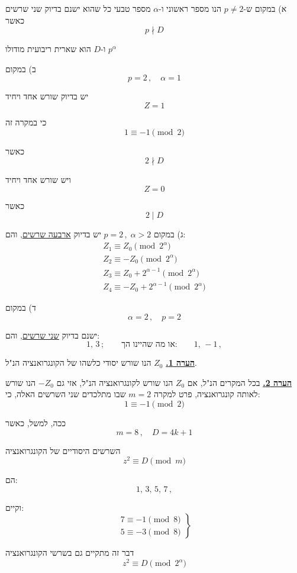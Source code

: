 \noindent א) במקום ש-$p \neq 2$ הנו מספר ראשוני ו-$\alpha$ מספר טבעי כל שהוא ישנם
בדיוק שני שרשים כאשר
\[ p \nmid D \]

\noindent ו-$D$ הוא שארית ריבועית מודולו $p^{\alpha}$

\medskip
\noindent ב) במקום
\[ p = 2 \, , \quad \alpha = 1 \]

\noindent יש בדיוק שורש אחד ויחיד
\[ Z = 1 \]

\noindent כי במקרה זה
\[ 1 \equiv -1 \pmod{2} \]

\noindent כאשר
\[ 2 \nmid D \]

\noindent ויש שורש אחד ויחיד
\[ Z = 0 \]

\noindent כאשר
\[ 2 \mid D \]

\medskip
\noindent ג) במקום $p = 2 \, , \; \alpha > 2$ יש בדיוק \underline{ארבעה שרשים}, והם:
\[ \begin{array}{l}
Z_1 \equiv Z_0 \pmod{2^{\alpha}} \\
Z_2 \equiv -Z_0 \pmod{2^{\alpha}} \\
Z_3 \equiv Z_0 + 2^{\alpha-1} \pmod{2^{\alpha}} \\
Z_4 \equiv -Z_0 + 2^{\alpha-1} \pmod{2^{\alpha}}
\end{array} \]

\medskip
\noindent ד) במקום
\[ \alpha = 2 \, , \quad p = 2 \]

\noindent ישנם בדיוק \underline{שני שרשים}, והם:
\[ 1, \, 3 \, ; \qquad \text{או מה שהיינו הך:} \qquad 1, \, -1 \, , \]

\bigskip
\noindent\textbf{\underline{הערה 1.}} $Z_0$ הנו שורש יסודי כלשהו של הקונגרואנציה הנ"ל.

\noindent\textbf{\underline{הערה 2.}} בכל המקרים הנ"ל, אם $Z_0$ הנו שורש לקונגרואנציה הנ"ל,
אזי גם $-Z_0$ הנו שורש לאותה קונגרואנציה, פרט למקרה $m=2$ שבו
מתלכדים שני השרשים האלה, כי:
\[ 1 \equiv -1 \pmod{2} \]

\noindent ככה, למשל, כאשר
\[ m = 8 \, , \quad D = 4k+1 \]

\noindent השרשים היסודיים של הקונגרואנציה
\[ z^2 \equiv D \pmod{m} \]

\noindent הם:
\[ 1, \, 3, \, 5, \, 7 \, , \]

\noindent וקיים:
\[ \left. \begin{array}{l}
7 \equiv -1 \pmod{8} \\
5 \equiv -3 \pmod{8}
\end{array} \right\} \]

\noindent דבר זה מתקיים גם בשרשי הקונגרואנציה
\[ z^2 \equiv D \pmod{2^{\alpha}} \]

